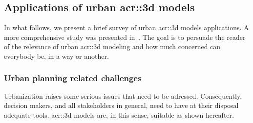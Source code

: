     \subsection{Applications of urban \acrshort{acr::3d} models}
        \label{subsec::introduction::urban_3d_reconstruction::applications}
        In what follows, we present a brief survey of  urban \gls{acr::3d} models applications.
        A more comprehensive study was presented in~\textcite{ijgi4042842}.
        The goal is to persuade the reader of the relevance of urban \gls{acr::3d} modeling and how much concerned can everybody be, in a way or another.

        \subsubsection{Urban planning related challenges}
        Urbanization raises some serious issues that need to be adressed.
        Consequently, decision makers, and all stakeholders in general, need to have at their disposal adequate tools.
        \gls{acr::3d} models are, in this sense, suitable as shown hereafter.\\

